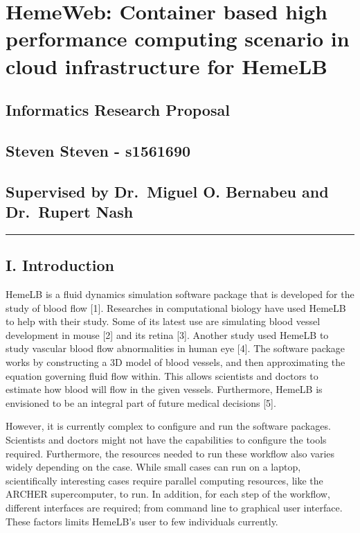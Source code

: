 \documentclass[]{article}
\date{}
\begin{document}
\section{HemeWeb: Container based high performance computing scenario in
cloud infrastructure for
HemeLB}\label{hemeweb-container-based-high-performance-computing-scenario-in-cloud-infrastructure-for-hemelb}

\subsection{Informatics Research
Proposal}\label{informatics-research-proposal}

\subsection{Steven Steven - s1561690}\label{steven-steven---s1561690}

\subsection{Supervised by Dr.~Miguel O. Bernabeu and Dr.~Rupert
Nash}\label{supervised-by-dr.miguel-o.-bernabeu-and-dr.rupert-nash}

\begin{center}\rule{0.5\linewidth}{\linethickness}\end{center}

\subsection{I. Introduction}\label{i.-introduction}

HemeLB is a fluid dynamics simulation software package that is developed
for the study of blood flow {[}1{]}. Researches in computational biology
have used HemeLB to help with their study. Some of its latest use are
simulating blood vessel development in mouse {[}2{]} and its retina
{[}3{]}. Another study used HemeLB to study vascular blood flow
abnormalities in human eye {[}4{]}. The software package works by
constructing a 3D model of blood vessels, and then approximating the
equation governing fluid flow within. This allows scientists and doctors
to estimate how blood will flow in the given vessels. Furthermore,
HemeLB is envisioned to be an integral part of future medical decisions
{[}5{]}.

However, it is currently complex to configure and run the software
packages. Scientists and doctors might not have the capabilities to
configure the tools required. Furthermore, the resources needed to run
these workflow also varies widely depending on the case. While small
cases can run on a laptop, scientifically interesting cases require
parallel computing resources, like the ARCHER supercomputer, to run. In
addition, for each step of the workflow, different interfaces are
required; from command line to graphical user interface. These factors
limits HemeLB's user to few individuals currently.
\end{document}
